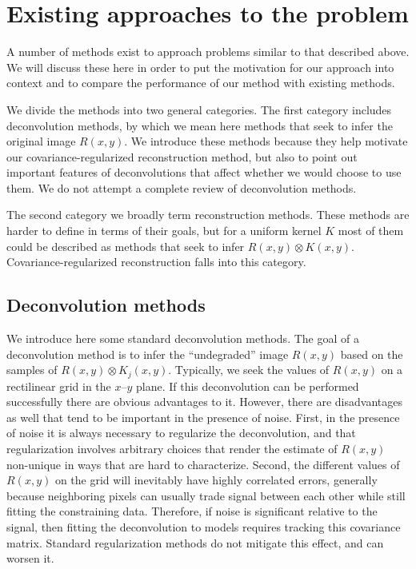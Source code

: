 \documentclass[twocolumn,tighten]{aastex61}
\begin{document}
\section{Existing approaches to the problem}
\label{sec:solutions}

A number of methods exist to approach problems similar to that
described above. We will discuss these here in order to put the
motivation for our approach into context and to compare the
performance of our method with existing methods.

We divide the methods into two general categories. The first category
includes deconvolution methods, by which we mean here methods that
seek to infer the original image $R(x,y)$. We introduce these methods
because they help motivate our covariance-regularized reconstruction
method, but also to point out important features of deconvolutions
that affect whether we would choose to use them. We do not attempt a
complete review of deconvolution methods.

The second category we broadly term reconstruction methods. These
methods are harder to define in terms of their goals, but for a
uniform kernel $K$ most of them could be described as methods that
seek to infer $R(x,y)\otimes K(x,y)$. Covariance-regularized
reconstruction falls into this category.

\subsection{Deconvolution methods}
\label{subsec:deconvolution}

We introduce here some standard deconvolution methods. The goal of a
deconvolution method is to infer the ``undegraded'' image $R(x,y)$
based on the samples of $R(x,y)\otimes K_j(x,y)$. Typically, we seek
the values of $R(x,y)$ on a rectilinear grid in the
$x$--$y$ plane. If this deconvolution can be performed successfully
there are obvious advantages to it. However, there are disadvantages
as well that tend to be important in the presence of noise. First, in
the presence of noise it is always necessary to regularize the
deconvolution, and that regularization involves arbitrary choices that
render the estimate of $R(x,y)$ non-unique in ways that are hard to
characterize. Second, the different values of $R(x,y)$ on the grid
will inevitably have highly correlated errors, generally because
neighboring pixels can usually trade signal between each other while
still fitting the constraining data. Therefore, if noise is
significant relative to the signal, then fitting the deconvolution to
models requires tracking this covariance matrix. Standard
regularization methods do not mitigate this effect, and can worsen it.
\end{document}
